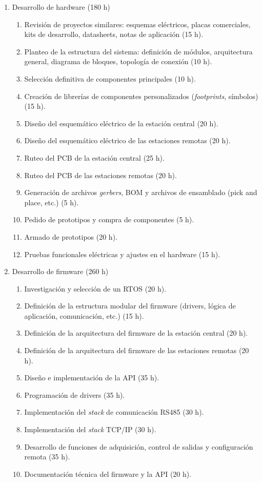 \documentclass[
11pt, %
]{charter}
\begin{document}
\begin{enumerate}
	\item Desarrollo de hardware (180 h)
	\begin{enumerate}
		\item Revisión de proyectos similares: esquemas eléctricos, placas comerciales, kits de desarrollo, datasheets, notas de aplicación (15 h).
		\item Planteo de la estructura del sistema: definición de módulos, arquitectura general, diagrama de bloques, topología de conexión (10 h).
		\item Selección definitiva de componentes principales (10 h).
		\item Creación de librerías de componentes personalizados (\textit{footprints}, símbolos) (15 h).
		\item Diseño del esquemático eléctrico de la estación central (20 h).
		\item Diseño del esquemático eléctrico de las estaciones remotas (20 h).
		\item Ruteo del PCB de la estación central (25 h).
		\item Ruteo del PCB de las estaciones remotas (20 h).
		\item Generación de archivos \textit{gerbers}, BOM y archivos de ensamblado (pick and place, etc.) (5 h).
		\item Pedido de prototipos y compra de componentes (5 h).
		\item Armado de prototipos (20 h).
		\item Pruebas funcionales eléctricas y ajustes en el hardware (15 h).
	\end{enumerate}
	\newpage
	\item Desarrollo de firmware (260 h)
	\begin{enumerate}
		\item Investigación y selección de un RTOS (20 h).
		\item Definición de la estructura modular del firmware (drivers, lógica de aplicación, comunicación, etc.) (15 h).
		\item Definición de la arquitectura del firmware de la estación central (20 h).
		\item Definición de la arquitectura del firmware de las estaciones remotas (20 h).
		\item Diseño e implementación de la API (35 h).
		\item Programación de drivers (35 h).
		\item Implementación del \textit{stack} de comunicación RS485 (30 h).
		\item Implementación del \textit{stack} TCP/IP (30 h).
		\item Desarrollo de funciones de adquisición, control de salidas y configuración remota (35 h).
		\item Documentación técnica del firmware y la API (20 h).
	\end{enumerate}
	

\end{enumerate}
\end{document}
